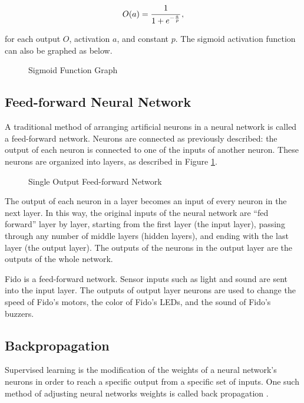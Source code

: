 \begin{equation}
	O(a) = \cfrac{1}{1+e^{-\frac{a}{p}}}
	\,,
\end{equation}

\noindent for each output $O$, activation $a$, and constant $p$. The sigmoid activation function can also be graphed as below.

\begin{figure}[ht]
	\centering
	
	\caption{Sigmoid Function Graph}
\end{figure}

\subsection{Feed-forward Neural Network}

A traditional method of arranging artificial neurons in a neural network is called a feed-forward network. Neurons are connected as previously described: the output of each neuron is connected to one of the inputs of another neuron. These neurons are organized into layers, as described in Figure \ref{fig:feedforward}.

\begin{figure}[ht]
	\centering
	
	\caption{Single Output Feed-forward Network}
	\label{fig:feedforward}
\end{figure}

The output of each neuron in a layer becomes an input of every neuron in the next layer. In this way, the original inputs of the neural network are ``fed forward'' layer by layer, starting from the first layer (the input layer), passing through any number of middle layers (hidden layers), and ending with the last layer (the output layer). The outputs of the neurons in the output layer are the outputs of the whole network.

Fido is a feed-forward network. Sensor inputs such as light and sound are sent into the input layer. The outputs of output layer neurons are used to change the speed of Fido's motors, the color of Fido's LEDs, and the sound of Fido's buzzers.

\subsection{Backpropagation}

Supervised learning is the modification of the weights of a neural network's neurons in order to reach a specific output from a specific set of inputs. One such method of adjusting neural networks weights is called back propagation \cite{werbos}.

